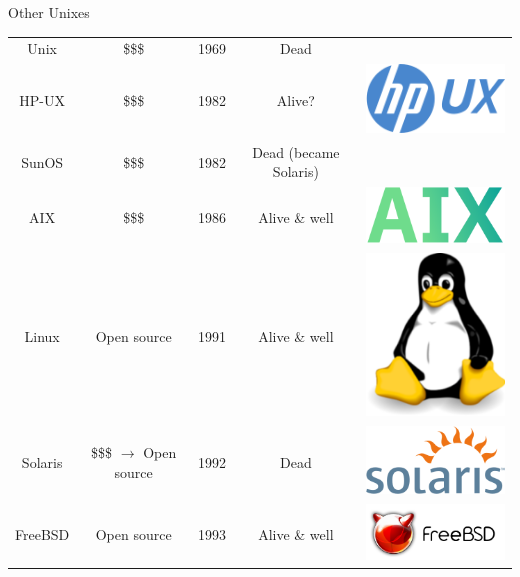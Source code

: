 \documentclass[graphics]{beamer}
\begin{document}
\begin{frame}{Other Unixes}
    \begin{tabular}{c c c c c}
        Unix & \$\$\$ & 1969 & Dead \\
        HP-UX & \$\$\$ & 1982 & Alive? & \includegraphics[scale=0.12]{L03_OperatingSystems/L3_hpux.png}\\
        SunOS & \$\$\$ & 1982 & Dead (became Solaris) \\
        AIX & \$\$\$ & 1986 & Alive \& well & \includegraphics[scale=0.1]{L03_OperatingSystems/L3_aix.png} \\
        Linux & Open source & 1991 & Alive \& well & \includegraphics[scale=0.05]{L03_OperatingSystems/L3_tux.png}\\
        Solaris & \$\$\$ $\rightarrow$ Open source & 1992 & Dead & \includegraphics[scale=0.14]{L03_OperatingSystems/L3_Solaris.png}\\
        FreeBSD & Open source & 1993 & Alive \& well & \includegraphics[scale=0.16]{L03_OperatingSystems/L3_freebsd.png}\\

\end{tabular}
\end{frame}
\end{document}
